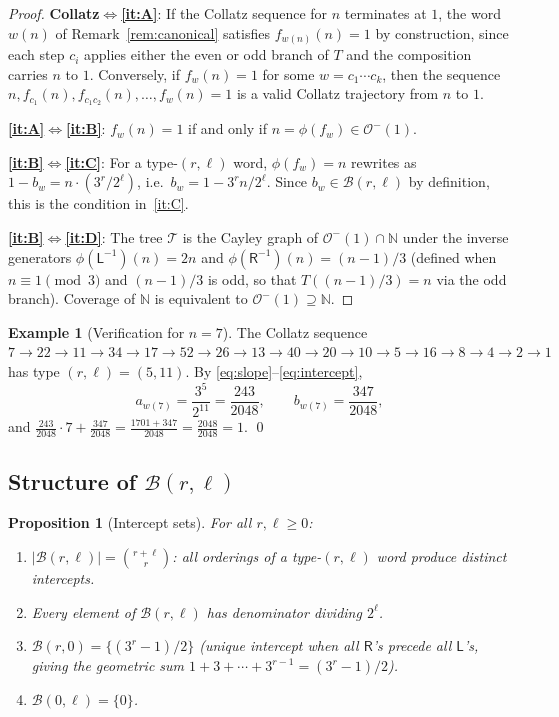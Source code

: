 \documentclass[12pt, a4paper]{amsart}
\theoremstyle{plain}
\newtheorem{proposition}[theorem]{Proposition}
\theoremstyle{definition}
\newtheorem{example}[theorem]{Example}
\theoremstyle{remark}
\newcommand{\N}{\mathbb{N}}
\newcommand{\wL}{\mathsf{L}}
\newcommand{\wR}{\mathsf{R}}
\begin{document}
\begin{proof}
  \textbf{Collatz}$\Leftrightarrow$\textbf{\ref{it:A}}:
  If the Collatz sequence for $n$ terminates at $1$, the word $w(n)$
  of Remark~\ref{rem:canonical} satisfies $f_{w(n)}(n)=1$ by
  construction, since each step $c_i$ applies either the even or odd
  branch of $T$ and the composition carries $n$ to $1$.
  Conversely, if $f_w(n)=1$ for some $w=c_1\cdots c_k$, then the
  sequence $n, f_{c_1}(n), f_{c_1 c_2}(n), \ldots, f_w(n)=1$ is a
  valid Collatz trajectory from $n$ to $1$.

  \textbf{\ref{it:A}}$\Leftrightarrow$\textbf{\ref{it:B}}:
  $f_w(n)=1$ if and only if $n=\phi(f_w)\in\mathcal{O}^-(1)$.

  \textbf{\ref{it:B}}$\Leftrightarrow$\textbf{\ref{it:C}}:
  For a type-$(r,\ell)$ word, $\phi(f_w)=n$ rewrites as
  $1-b_w = n\cdot(3^r/2^\ell)$, i.e.\ $b_w = 1-3^r n/2^\ell$.
  Since $b_w\in\mathcal{B}(r,\ell)$ by definition, this is the
  condition in~\ref{it:C}.

  \textbf{\ref{it:B}}$\Leftrightarrow$\textbf{\ref{it:D}}:
  The tree $\mathcal{T}$ is the Cayley graph of
  $\mathcal{O}^-(1)\cap\N$ under the inverse generators
  $\phi(\wL^{-1})(n) = 2n$ and $\phi(\wR^{-1})(n) = (n-1)/3$
  (defined when $n\equiv 1\pmod{3}$ and $(n-1)/3$ is odd, so that
  $T((n-1)/3)=n$ via the odd branch).  Coverage of $\N$ is
  equivalent to $\mathcal{O}^-(1)\supseteq\N$.
\end{proof}

\begin{example}[Verification for $n=7$]
  The Collatz sequence $7\to22\to11\to34\to17\to52\to26\to13
  \to40\to20\to10\to5\to16\to8\to4\to2\to1$ has type $(r,\ell)=(5,11)$.
  By \eqref{eq:slope}--\eqref{eq:intercept},
  \[
    a_{w(7)} = \frac{3^5}{2^{11}} = \frac{243}{2048},
    \qquad
    b_{w(7)} = \frac{347}{2048},
  \]
  and $\frac{243}{2048}\cdot 7 + \frac{347}{2048}
       = \frac{1701+347}{2048} = \frac{2048}{2048} = 1$. \qed
\end{example}

\subsection{Structure of $\mathcal{B}(r,\ell)$}

\begin{proposition}[Intercept sets]
  \label{prop:intercepts}
  For all $r,\ell\geq 0$:
  \begin{enumerate}[label=\textup{(\roman*)}]
    \item $|\mathcal{B}(r,\ell)| = \binom{r+\ell}{r}$: all orderings
          of a type-$(r,\ell)$ word produce distinct intercepts.
    \item Every element of $\mathcal{B}(r,\ell)$ has denominator
          dividing $2^\ell$.
    \item $\mathcal{B}(r,0) = \{(3^r-1)/2\}$ (unique intercept when
          all $\wR$'s precede all $\wL$'s, giving the geometric sum
          $1+3+\cdots+3^{r-1}=(3^r-1)/2$).
    \item $\mathcal{B}(0,\ell) = \{0\}$.
  \end{enumerate}
\end{proposition}
\end{document}

